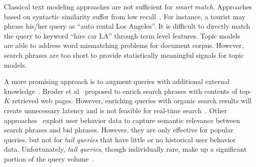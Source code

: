 Classical text modeling approaches are not sufficient for
\emph{smart match}.  Approaches
based on syntactic similarity suffer from low
recall~\cite{wang:advertisementsearch}.  For instance, a tourist may
phrase his/her query as ``auto rental Los Angeles''.  It is difficult
to directly match the query to keyword ``hire car LA'' through term
level features.  Topic
models~\cite{blei:dirichletallocation,deerwester:semanticanalysis} are
able to address word mismatching problems for document corpus.
However, search phrases are too short to provide statistically
meaningful signals for topic models.

A more promising approach is to augment queries with additional
external knowledge~\cite{broder:webknowledge}.  Broder et
al~\cite{broder:relevancefeedback} proposed to enrich search phrases
with contents of top-$K$ retrieved web pages.  However, enriching
queries with organic search results will create unnecessary latency
and is not feasible for real-time
search~\cite{broder:sponsoredsearch}.  Other
approaches~\cite{cui:querylogs,broder:webknowledge,fuxman:keywordgeneration}
exploit user behavior data to capture semantic relevance between
search phrases and bid phrases. However, they are only effective for
popular queries, but not for \emph{tail queries} that have little or
no historical user behavior data.  Unfortunately, \emph{tail queries},
though individually rare, make up a significant portion of the query
volume~\cite{broder:sponsoredsearch}.



